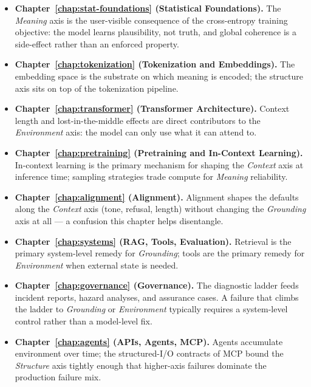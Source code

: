 \begin{itemize}
  \item \textbf{Chapter~\ref{chap:stat-foundations} (Statistical Foundations).} The
        \emph{Meaning} axis is the user-visible consequence of the
        cross-entropy training objective: the model learns
        plausibility, not truth, and global coherence is a
        side-effect rather than an enforced property.
  \item \textbf{Chapter~\ref{chap:tokenization} (Tokenization and Embeddings).} The
        embedding space is the substrate on which meaning is
        encoded; the structure axis sits on top of the
        tokenization pipeline.
  \item \textbf{Chapter~\ref{chap:transformer} (Transformer Architecture).} Context
        length and lost-in-the-middle effects are direct
        contributors to the \emph{Environment} axis: the model can
        only use what it can attend to.
  \item \textbf{Chapter~\ref{chap:pretraining} (Pretraining and In-Context Learning).}
        In-context learning is the primary mechanism for shaping
        the \emph{Context} axis at inference time; sampling
        strategies trade compute for \emph{Meaning} reliability.
  \item \textbf{Chapter~\ref{chap:alignment} (Alignment).} Alignment shapes the
        defaults along the \emph{Context} axis (tone, refusal,
        length) without changing the \emph{Grounding} axis at all
        --- a confusion this chapter helps disentangle.
  \item \textbf{Chapter~\ref{chap:systems} (RAG, Tools, Evaluation).} Retrieval is
        the primary system-level remedy for \emph{Grounding};
        tools are the primary remedy for \emph{Environment} when
        external state is needed.
  \item \textbf{Chapter~\ref{chap:governance} (Governance).} The diagnostic ladder
        feeds incident reports, hazard analyses, and assurance
        cases. A failure that climbs the ladder to
        \emph{Grounding} or \emph{Environment} typically requires
        a system-level control rather than a model-level fix.
  \item \textbf{Chapter~\ref{chap:agents} (APIs, Agents, MCP).} Agents accumulate
        environment over time; the structured-I/O contracts of
        MCP bound the \emph{Structure} axis tightly enough that
        higher-axis failures dominate the production failure mix.
\end{itemize}

